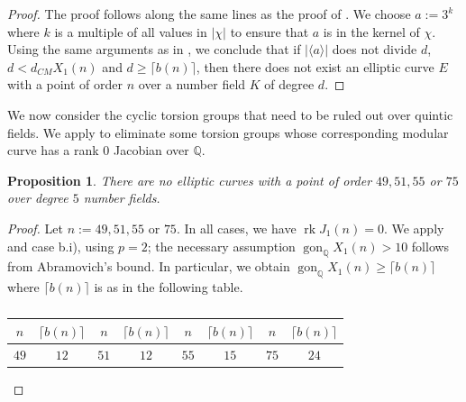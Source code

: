 \documentclass[11pt,reqno]{amsart}
\DeclareMathOperator{\rk}{rk}
\DeclareMathOperator{\gon}{gon}
\newtheorem{proposition}[theorem]{Proposition}
\theoremstyle{definition}
\numberwithin{equation}{section}
\newcommand{\Q}{\mathbb{Q}}
\newcommand{\diamondop}[1]{\langle #1 \rangle} %
\begin{document}
\begin{proof}
    The proof  follows along the same lines as the proof of . We choose $a:=3^k$ where $k$ is a multiple of all values in $|\chi|$ to ensure that $a$ is in the kernel of $\chi$. Using the same arguments as in , we conclude that if $|\diamondop{a}|$ does not divide $d$, $d<d_{CM}X_1(n)$ and $d\geq \lceil b(n)\rceil $, then there does not exist an elliptic curve $E$ with a point of order $n$ over a number field $K$ of degree $d$.
    \end{proof}

We now consider the cyclic torsion groups that need to be ruled out over quintic fields. We apply  to eliminate some torsion groups whose corresponding modular curve has a rank 0 Jacobian over $\Q$.  

\begin{proposition}\label{prop:d5r0}
    There are no elliptic curves with a point of order $49,51,55$ or $75$ over degree $5$ number fields. 
\end{proposition}
\begin{proof}
    Let $n:=49,51,55$ or $75$. In all cases, we have $\rk J_1(n)=0.$ We apply  and  case b.i), using $p=2$; the necessary assumption $\gon_\Q X_1(n)>10$ follows from Abramovich's bound. In particular, we obtain $\gon_\Q X_1(n)\geq \lceil b(n) \rceil$ where $\lceil b(n) \rceil$ is as in the following table. 
    \begin{table}[H]
\centering
\begin{tabular}{c|c||c|c||c|c||c|c}
$n$ & $\lceil b(n)\rceil$& $n$ & $\lceil b(n)\rceil$&$n$ & $\lceil b(n)\rceil$&$n$ & $\lceil b(n)\rceil$ \\ 
\hline
$49$ & $12$ & $51$ & $12$ & $55$ & $15$ & $75$ & $24$ \\
\hline

\end{tabular}
\caption{}\label{table:gonalities}
\end{table}
    
\end{proof}
\end{document}
